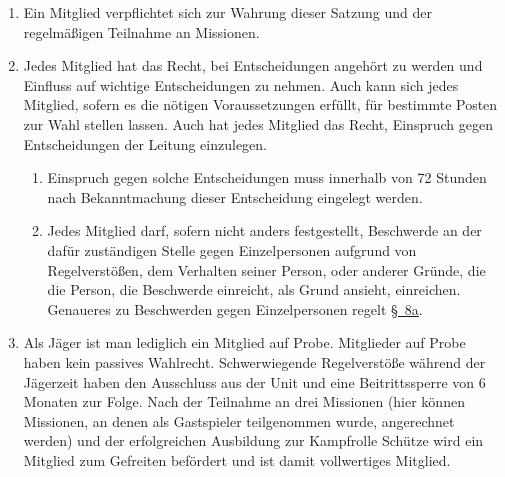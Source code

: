 \begin{enumerate}[label=(\arabic*)]
    \begin{enumerate}[label=(\Alph*)]
        \item\label{itm:ausschluss_aus_der_unit_durch_falsche_angaben} Stellt sich heraus, dass sich die Mitgliedschaft durch Falschbehauptungen im Beitrittsantrag erschlichen wurde, führt dies zum Ausschluss aus der Unit und einer Beitrittssperre von mindestens 6 Monaten. Ein Mitglied muss der Leitung unverzüglich mitteilen, wenn es vermutet, dass ein anderes Mitglied die Mitgliedschaft erschlichen hat. Geschieht dies nicht, wird dieses Mitglied nach \S~8 Absatz \ref{itm:strafe_schwerer_verstoß} bestraft.
    \end{enumerate}
    \item Ein Mitglied verpflichtet sich zur Wahrung dieser Satzung und der regelmäßigen Teilnahme an Missionen.
    \item Jedes Mitglied hat das Recht, bei Entscheidungen angehört zu werden und Einfluss auf wichtige Entscheidungen zu nehmen. Auch kann sich jedes Mitglied, sofern es die nötigen Voraussetzungen erfüllt, für bestimmte Posten zur Wahl stellen lassen. Auch hat jedes Mitglied das Recht, Einspruch gegen Entscheidungen der Leitung einzulegen.   
    \begin{enumerate}[label=(\Alph*)]
        \item Einspruch gegen solche Entscheidungen muss innerhalb von 72 Stunden nach Bekanntmachung dieser Entscheidung eingelegt werden.      
        \item Jedes Mitglied darf, sofern nicht anders festgestellt, Beschwerde an der dafür zuständigen Stelle gegen Einzelpersonen aufgrund von Regelverstößen, dem Verhalten seiner Person, oder anderer Gründe, die die Person, die Beschwerde einreicht, als Grund ansieht, einreichen. Genaueres zu Beschwerden gegen Einzelpersonen regelt \hyperref[sec:umgang_mit_beschwerden_gegen_einzelpersonen]{\S~8a}.
    \end{enumerate}
    \item Als Jäger ist man lediglich ein Mitglied auf Probe. Mitglieder auf Probe haben kein passives Wahlrecht. Schwerwiegende Regelverstöße während der Jägerzeit haben den Ausschluss aus der Unit und eine Beitrittssperre von 6 Monaten zur Folge. Nach der Teilnahme an drei Missionen (hier können Missionen, an denen als Gastspieler teilgenommen wurde, angerechnet werden) und der erfolgreichen Ausbildung zur Kampfrolle Schütze wird ein Mitglied zum Gefreiten befördert und ist damit vollwertiges Mitglied.    
    \begin{enumerate}[label=(\Alph*)]

\end{enumerate}
\end{enumerate}
